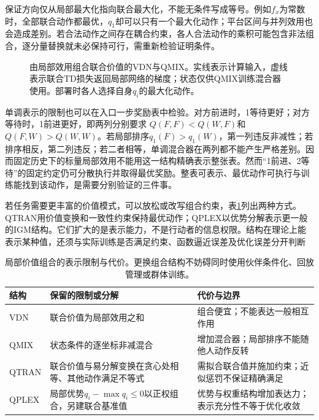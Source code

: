 保证方向仅从局部最大化指向联合最大化，不能无条件写成等号。例如$f_x$为常数时，全部联合动作都最优，$q_1$却可以只有一个最大化动作；平台区间与并列效用也会造成差别。若合法动作之间存在耦合约束，各人合法动作的乘积可能包含非法组合，逐分量替换就未必保持可行，需重新检验证明条件。

\begin{figure}[htbp]
 \centering
 
 \caption{由局部效用组合联合价值的VDN与QMIX。实线表示计算输入，虚线表示联合TD损失返回局部网络的梯度；状态仅供QMIX训练混合器使用。部署时各人选择自身$q_i$的最大化动作。}
 \label{fig:rl-multi-agent-mixers}
\end{figure}

单调表示的限制也可以在入口一步奖励表中检验。对方前进时，1等待更好；对方等待时，1前进更好，即两列分别要求
$Q(F,F)<Q(W,F)$和$Q(F,W)>Q(W,W)$。若局部排序$q_1(F)>q_1(W)$，第一列违反非减性；若排序相反，第二列违反；若二者相等，单调混合器在两列都不能产生严格差别。因而固定历史下的标量局部效用不能用这一结构精确表示整张表。然而“1前进、2等待”的固定约定仍可分散执行并取得最优奖励。整表可表示、最优动作可执行与训练能找到该动作，是需要分别验证的三件事。

若任务需要更丰富的价值模式，可以放松或改写组合约束，表\ref{tab:rl-multi-agent-factorization}列出两种方式。QTRAN用价值变换和一致性约束保持最优动作；QPLEX以优势分解表示更一般的IGM结构。它们扩大的是表示能力，不是行动者的信息权限。结构在理论上能表示某种值，还须与实际训练是否满足约束、函数逼近误差及优化误差分开判断

\begin{table}[htbp]
 \centering
 \begin{tabularx}{\linewidth}{@{}l >{\raggedright\arraybackslash}X >{\raggedright\arraybackslash}X@{}}
 \toprule
 结构 & 保留的限制或分解 & 代价与边界\\
 \midrule
 VDN & 联合价值为局部效用之和 & 组合便宜；不能表达一般相互作用\\
 QMIX & 状态条件的逐坐标非减混合 & 增加混合器；局部排序不能随他人动作反转\\
 QTRAN & 联合价值与易分解变换在贪心处相等、其他动作满足不等式 & 需拟合联合值并施加约束；近似惩罚不保证精确满足\\
 QPLEX & 局部优势$q_i-\max q_i\leq0$以正权组合，另建联合基准值 & 优势与权重结构增加表达力；表示充分性不等于优化收敛\\
 \bottomrule
 \end{tabularx}
 \caption{局部价值组合的表示限制与代价。更换组合结构不妨碍同时使用伙伴条件化、回放管理或群体训练。}
 \label{tab:rl-multi-agent-factorization}
\end{table}

